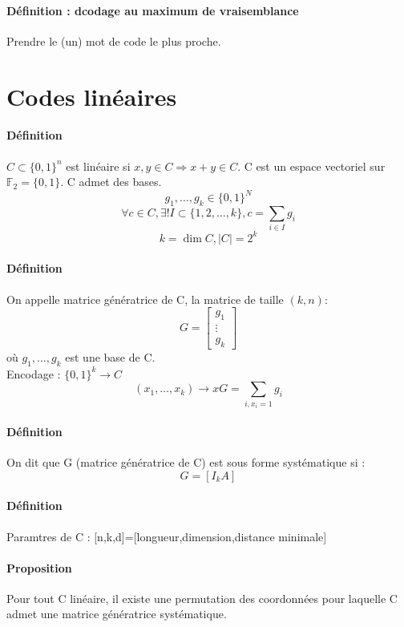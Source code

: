 \documentclass[12pt,a4paper]{report}
\begin{document}
\paragraph{Définition : dcodage au maximum de vraisemblance\\}
Prendre le (un) mot de code le plus proche.
\section{Codes linéaires}
\paragraph{Définition\\}
$C \subset \{0,1\}^n $ est linéaire si $x,y \in C \Rightarrow x+y \in C$. C est un espace vectoriel sur $\mathbb{F}_2=\{0,1\}$. C admet des bases.
$$ g_1, \ldots, g_k \in \{0,1\}^N $$
$$ \forall c \in C, \exists ! I \subset \{1,2,\ldots,k\}, c=\sum_{i\in I} g_i$$
$$ k= \dim C, |C|=2^k$$
\paragraph{Définition\\}
On appelle matrice génératrice de C, la matrice de taille $(k,n)$:
$$ G = \left[ \begin{array}{l}
g_1 \\
\vdots \\
g_k \end{array}\right]$$
où $ g_1,\ldots, g_k$ est une base de C.\\
Encodage : $\{0,1\}^k \rightarrow C $\\
$$ (x_1,\ldots,x_k) \rightarrow xG = \sum_{i,x_i=1} g_i $$
\paragraph{Définition\\}
On dit que G (matrice génératrice de C) est sous forme systématique si :
$$G=[ I_k A]$$
\paragraph{Définition\\}
Paramtres de C : [n,k,d]=[longueur,dimension,distance minimale]
\paragraph{Proposition\\}
Pour tout C linéaire, il existe une permutation des coordonnées pour laquelle C admet une matrice génératrice systématique.
\end{document}
